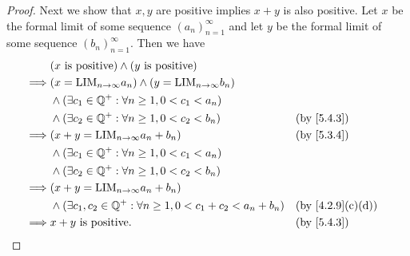 \begin{proof}
	Next we show that \(x, y\) are positive implies \(x + y\) is also positive.
	Let \(x\) be the formal limit of some sequence \((a_n)_{n = 1}^{\infty}\) and let \(y\) be the formal limit of some sequence \((b_n)_{n = 1}^{\infty}\).
	Then we have
	\begin{align*}
		         & (x \text{ is positive}) \land (y \text{ is positive})                                                               \\
		\implies & (x = \text{LIM}_{n \to \infty} a_n) \land (y = \text{LIM}_{n \to \infty} b_n)                                       \\
		         & \land (\exists c_1 \in \Q^+ : \forall n \geq 1, 0 < c_1 < a_n)                                                      \\
		         & \land (\exists c_2 \in \Q^+ : \forall n \geq 1, 0 < c_2 < b_n)                  &  & \by{5.4.3}                     \\
		\implies & (x + y = \text{LIM}_{n \to \infty} a_n + b_n)                                   &  & \by{5.3.4}                     \\
		         & \land (\exists c_1 \in \Q^+ : \forall n \geq 1, 0 < c_1 < a_n)                                                      \\
		         & \land (\exists c_2 \in \Q^+ : \forall n \geq 1, 0 < c_2 < b_n)                                                      \\
		\implies & (x + y = \text{LIM}_{n \to \infty} a_n + b_n)                                                                       \\
		         & \land (\exists c_1, c_2 \in \Q^+ : \forall n \geq 1, 0 < c_1 + c_2 < a_n + b_n) &  & \text{(by \cref{4.2.9}(c)(d))} \\
		\implies & x + y \text{ is positive}.                                                      &  & \by{5.4.3}
	\end{align*}


\end{proof}

